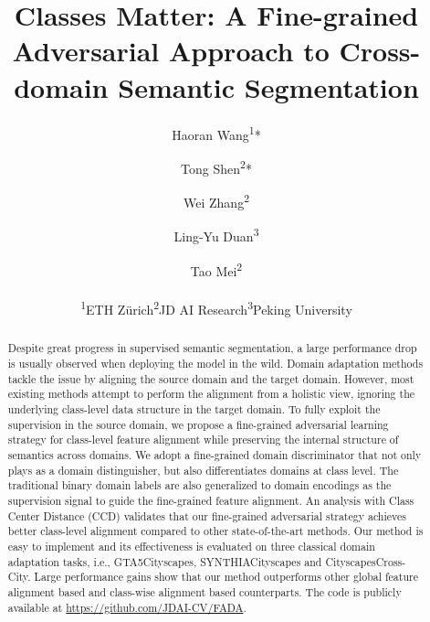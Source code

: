 \documentclass[runningheads]{llncs}
\begin{document}
\pagestyle{headings}
\mainmatter
\def\ECCVSubNumber{2246}  

\title{Classes Matter: A Fine-grained Adversarial Approach to Cross-domain Semantic Segmentation} 

\begin{comment}
\titlerunning{ECCV-20 submission ID \ECCVSubNumber} 
\authorrunning{ECCV-20 submission ID \ECCVSubNumber} 
\author{Anonymous ECCV submission}
\institute{Paper ID \ECCVSubNumber}
\end{comment}


\author{Haoran Wang\textsuperscript{1}* \and
Tong Shen\textsuperscript{2}* \and
Wei Zhang\textsuperscript{2} \and
Ling-Yu Duan\textsuperscript{3} \and
Tao Mei\textsuperscript{2} \\
\quad \\
\small \textsuperscript{1}ETH Z{\"u}rich\quad \textsuperscript{2}JD AI Research\quad \textsuperscript{3}Peking University
}




\institute{}
\maketitle

\def\thefootnote{*}\def\thefootnote{\arabic{footnote}}

\begin{abstract}
Despite great progress in supervised semantic segmentation, a large performance drop is usually observed when deploying the model in the wild. 
Domain adaptation methods tackle the issue by aligning the source domain and the target domain. However, most existing methods attempt to perform the alignment from a holistic view, ignoring the underlying class-level data structure in the target domain.
To fully exploit the supervision in the source domain, we propose a fine-grained adversarial learning strategy for class-level feature alignment while preserving the internal structure of semantics across domains. 
We adopt a fine-grained domain discriminator that not only plays as a domain distinguisher, but also differentiates domains at class level. The traditional binary domain labels are also generalized to domain encodings as the supervision signal to guide the fine-grained feature alignment.
An analysis with Class Center Distance (CCD) validates that our fine-grained adversarial strategy achieves better class-level alignment compared to other state-of-the-art methods.
Our method is easy to implement and its effectiveness is evaluated on three classical domain adaptation tasks, i.e., GTA5Cityscapes, SYNTHIACityscapes and CityscapesCross-City.
Large performance gains show that our method outperforms other global feature alignment based and class-wise alignment based counterparts. The code is publicly available at \url{https://github.com/JDAI-CV/FADA}.
 \end{abstract}
\end{document}
